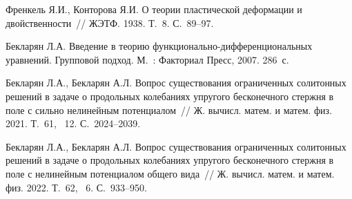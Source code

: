 \begin{thebibliography}{4} %
    
 Френкель Я.И., Конторова Я.И. О теории пластической деформации и двойственности~// ЖЭТФ.  1938.  Т.~8.  С.~89--97.

 Бекларян Л.А. Введение в теорию функ\-ци\-о\-наль\-но-диф\-фе\-рен\-ци\-о\-наль\-ных уравнений. Групповой подход.  М.~: Факториал Пресс, 2007.  286~с.

 Бекларян Л.А., Бекларян А.Л.  Вопрос существования ограниченных солитонных решений в задаче о продольных колебаниях упругого бесконечного стержня в поле с сильно нелинейным потенциалом~// Ж. вычисл. матем. и матем. физ. 2021. Т.~61, \textnumero~12. С.~2024--2039.

 Бекларян Л.А., Бекларян А.Л. Вопрос существования ограниченных солитонных решений в задаче о продольных колебаниях упругого бесконечного стержня в поле с нелинейным потенциалом общего вида~// Ж. вычисл. матем. и матем. физ.  2022.  Т.~62, \textnumero~6. С.~933--950.

\end{thebibliography}





%

